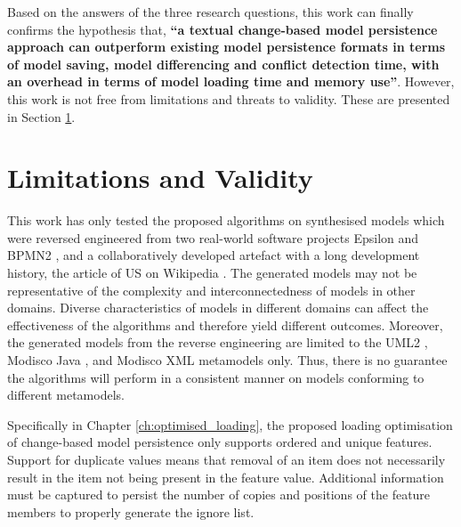 Based on the answers of the three research questions, this work can finally confirms the hypothesis that, 
\textbf{``a textual change-based model persistence approach can outperform existing model persistence formats in terms of model saving, model differencing and conflict detection time, with an overhead in terms of model loading time and memory use''}. However, this work is not free from limitations and threats to validity. These are presented in Section \ref{sec:limitation_and_Threat_to_validity}.

\section{Limitations and Validity}
\label{sec:limitation_and_Threat_to_validity}
This work has only tested the proposed algorithms on synthesised models which were reversed engineered from two real-world software projects Epsilon \cite{eclipse2018epsilongit} and BPMN2 \cite{eclipse2018bpmn2git}, and a collaboratively developed artefact with a long development history, the article of US on Wikipedia \cite{wikipedia2018us}. The generated models may not be representative of the complexity and interconnectedness of models in other domains. Diverse characteristics of models in different domains can affect the effectiveness of the algorithms and therefore yield different outcomes. Moreover, the generated models from the reverse engineering are limited to the UML2 \cite{eclipse2017uml2}, Modisco Java \cite{eclipse2018modiscojava}, and Modisco XML \cite{eclipse2018modiscoxml} metamodels only. Thus, there is no guarantee the algorithms will perform in a consistent manner on models conforming to different metamodels.

Specifically in Chapter \ref{ch:optimised_loading}, the proposed loading optimisation of change-based model persistence only supports ordered and unique features. Support for duplicate values means that removal of an item does not necessarily result in the item not being present in the feature value. Additional information must be captured to persist the number of copies and positions of the feature members to properly generate the ignore list. 

